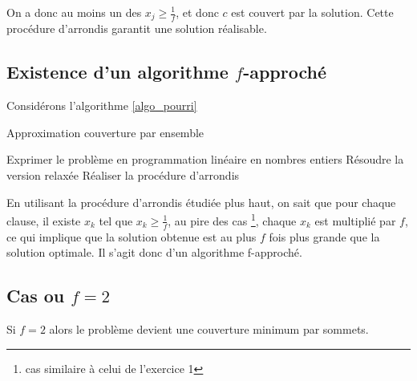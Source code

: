On a donc au moins un des $x_j \geq \frac{1}{f}$, et donc $c$ est couvert par la solution. Cette
procédure d'arrondis garantit une solution réalisable.

\subsection{Existence d'un algorithme $f$-approché}

Considérons l'algorithme \ref{algo_pourri}
\begin{algorithm}
	\caption{Approximation couverture par ensemble}
	\label{algo_pourri}
	\begin{algorithmic}[1]
		\STATE Exprimer le problème en programmation linéaire en nombres entiers
		\STATE Résoudre la version relaxée
		\STATE Réaliser la procédure d'arrondis
	\end{algorithmic}
\end{algorithm}

En utilisant la procédure d'arrondis étudiée plus haut, on sait que pour chaque clause, il existe
$x_k$ tel que $x_k \geq \frac{1}{f}$, au pire des cas \footnote{cas similaire à celui de l'exercice
1}, chaque $x_k$ est multiplié par $f$, ce qui implique que la solution obtenue est au plus $f$ fois
plus grande que la solution optimale. Il s'agit donc d'un algorithme f-approché.

\subsection{Cas ou $f=2$}

Si $f=2$ alors le problème devient une couverture minimum par sommets.
